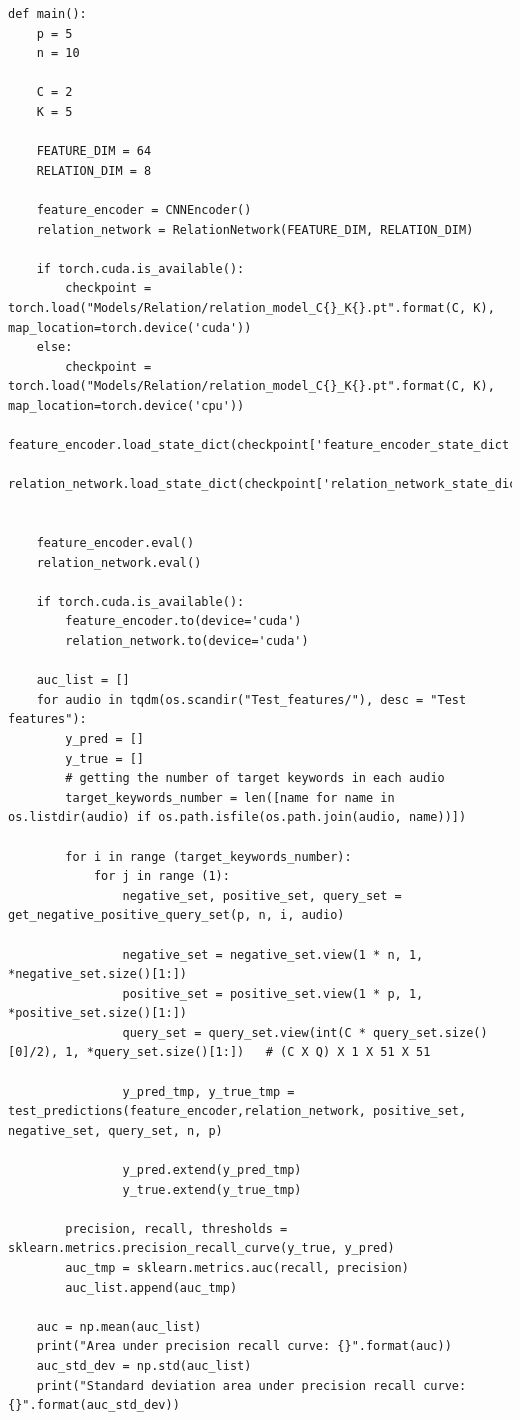 \documentclass[12pt,a4paper,titlepage]{article}
\begin{document}
\begin{lstlisting}[language=iPython,firstnumber=99, caption=relation\_test.py, label=relation test,captionpos=b]
def main():
    p = 5
    n = 10

    C = 2
    K = 5

    FEATURE_DIM = 64
    RELATION_DIM = 8

    feature_encoder = CNNEncoder()
    relation_network = RelationNetwork(FEATURE_DIM, RELATION_DIM)

    if torch.cuda.is_available():
        checkpoint = torch.load("Models/Relation/relation_model_C{}_K{}.pt".format(C, K), map_location=torch.device('cuda'))
    else:
        checkpoint = torch.load("Models/Relation/relation_model_C{}_K{}.pt".format(C, K), map_location=torch.device('cpu'))
    feature_encoder.load_state_dict(checkpoint['feature_encoder_state_dict'])
    relation_network.load_state_dict(checkpoint['relation_network_state_dict'])


    feature_encoder.eval()
    relation_network.eval()

    if torch.cuda.is_available():
        feature_encoder.to(device='cuda')
        relation_network.to(device='cuda')

    auc_list = []
    for audio in tqdm(os.scandir("Test_features/"), desc = "Test features"):
        y_pred = []
        y_true = []
        # getting the number of target keywords in each audio
        target_keywords_number = len([name for name in os.listdir(audio) if os.path.isfile(os.path.join(audio, name))])

        for i in range (target_keywords_number):
            for j in range (1):
                negative_set, positive_set, query_set = get_negative_positive_query_set(p, n, i, audio)

                negative_set = negative_set.view(1 * n, 1, *negative_set.size()[1:])  
                positive_set = positive_set.view(1 * p, 1, *positive_set.size()[1:]) 
                query_set = query_set.view(int(C * query_set.size()[0]/2), 1, *query_set.size()[1:])   # (C X Q) X 1 X 51 X 51
                
                y_pred_tmp, y_true_tmp = test_predictions(feature_encoder,relation_network, positive_set, negative_set, query_set, n, p)

                y_pred.extend(y_pred_tmp)
                y_true.extend(y_true_tmp)

        precision, recall, thresholds = sklearn.metrics.precision_recall_curve(y_true, y_pred)
        auc_tmp = sklearn.metrics.auc(recall, precision)
        auc_list.append(auc_tmp)
        
    auc = np.mean(auc_list)
    print("Area under precision recall curve: {}".format(auc))
    auc_std_dev = np.std(auc_list)
    print("Standard deviation area under precision recall curve: {}".format(auc_std_dev))
\end{lstlisting}
\end{document}
